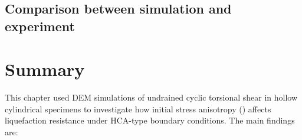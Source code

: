 \documentclass[../main]{subfiles}
\begin{document}

\subsection{Comparison between simulation and experiment}
\label{subsec:ch4_comparison}



\section{Summary}
\label{sec:ch4_summary}

This chapter used DEM simulations of undrained cyclic torsional shear in hollow cylindrical specimens to investigate how initial stress anisotropy (\Kzero{}) affects liquefaction resistance under HCA-type boundary conditions. The main findings are:
\end{document}
